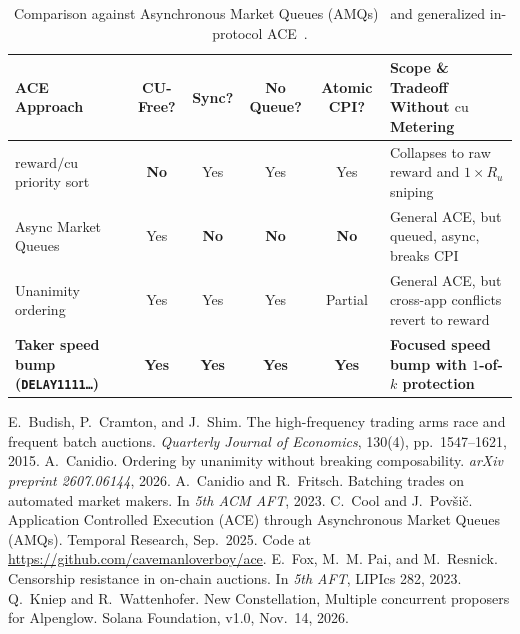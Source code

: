 \documentclass[10pt,a4paper]{article}
\newcommand{\DelayAcct}{\texttt{DELAY1111\allowbreak\dots}}
\begin{document}
\begin{table}[h!]
\centering
\footnotesize
\renewcommand{\arraystretch}{1.16}
\begin{tabularx}{\textwidth}{@{}l c c c c Y@{}}
\toprule
\textbf{ACE Approach} & \textbf{CU-Free?} & \textbf{Sync?} & \textbf{No Queue?} & \textbf{Atomic CPI?} & \textbf{Scope \& Tradeoff Without $\mathrm{cu}$ Metering} \\
\midrule
$\mathrm{reward}/\mathrm{cu}$ priority sort & \textbf{No} & Yes & Yes & Yes & Collapses to raw $\mathrm{reward}$ and $1\times R_u$ sniping \\
Async Market Queues~\cite{CP25} & Yes & \textbf{No} & \textbf{No} & \textbf{No} & General ACE, but queued, async, breaks CPI \\
Unanimity ordering~\cite{Can26} & Yes & Yes & Yes & Partial & General ACE, but cross-app conflicts revert to $\mathrm{reward}$ \\
\textbf{Taker speed bump (\DelayAcct{})} & \textbf{Yes} & \textbf{Yes} & \textbf{Yes} & \textbf{Yes} & \textbf{Focused speed bump with $1$-of-$k$ protection} \\
\bottomrule
\end{tabularx}
\caption{Comparison against Asynchronous Market Queues (AMQs)~\cite{CP25} and generalized in-protocol ACE~\cite{Can26}.}
\label{tab:comparison}
\end{table}

\begin{thebibliography}{KW26}\small\setlength{\itemsep}{2pt}\setlength{\parskip}{0pt}
E.~Budish, P.~Cramton, and J.~Shim. The high-frequency trading arms race and frequent batch auctions. \emph{Quarterly Journal of Economics}, 130(4), pp.~1547--1621, 2015.
A.~Canidio. Ordering by unanimity without breaking composability. \emph{arXiv preprint 2607.06144}, 2026.
A.~Canidio and R.~Fritsch. Batching trades on automated market makers. In \emph{5th ACM AFT}, 2023.
C.~Cool and J.~Pov\v{s}i\v{c}. Application Controlled Execution (ACE) through Asynchronous Market Queues (AMQs). Temporal Research, Sep.\ 2025. Code at \url{https://github.com/cavemanloverboy/ace}.
E.~Fox, M.~M. Pai, and M.~Resnick. Censorship resistance in on-chain auctions. In \emph{5th AFT}, LIPIcs 282, 2023.
Q.~Kniep and R.~Wattenhofer. New Constellation, Multiple concurrent proposers for Alpenglow. Solana Foundation, v1.0, Nov.\ 14, 2026.
\end{thebibliography}
\end{document}
